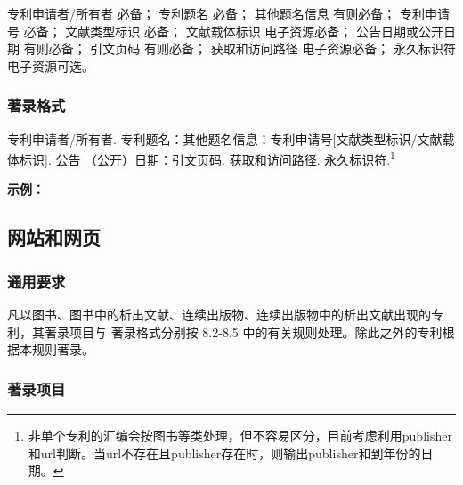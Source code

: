 \documentclass{article}
\begin{document}
专利申请者/所有者 必备；
专利题名 必备；
其他题名信息 有则必备；
专利申请号 必备；
文献类型标识 必备；
文献载体标识 电子资源必备；
公告日期或公开日期 有则必备；
引文页码 有则必备；
获取和访问路径 电子资源必备；
永久标识符 电子资源可选。

\subsubsection{著录格式}

专利申请者/所有者. 专利题名：其他题名信息：专利申请号[文献类型标识/文献载体标识]. 公告
（公开）日期：引文页码. 获取和访问路径. 永久标识符.\footnote{非单个专利的汇编会按图书等类处理，但不容易区分，目前考虑利用publisher和url判断。当url不存在且publisher存在时，则输出publisher和到年份的日期。}



\begin{refsection}

\nocite{邓一刚2006--,张凯军2012-04-05--,李华2023,
西安电子科技大学2002--,河北绿洲生态环境科技有限公司2001--,
苏州生物2022,Tachibana2005--,TRISCO2022,中国焊接协会2023}



{

\textbf{示例：}

{\printbibliography[heading=none,env=indentegenv]}
}
\end{refsection}

\subsection{网站和网页}

\subsubsection{通用要求}

凡以图书、图书中的析出文献、连续出版物、连续出版物中的析出文献出现的专利，其著录项目与
著录格式分别按 8.2-8.5 中的有关规则处理。除此之外的专利根据本规则著录。

\subsubsection{著录项目}
\end{document}
